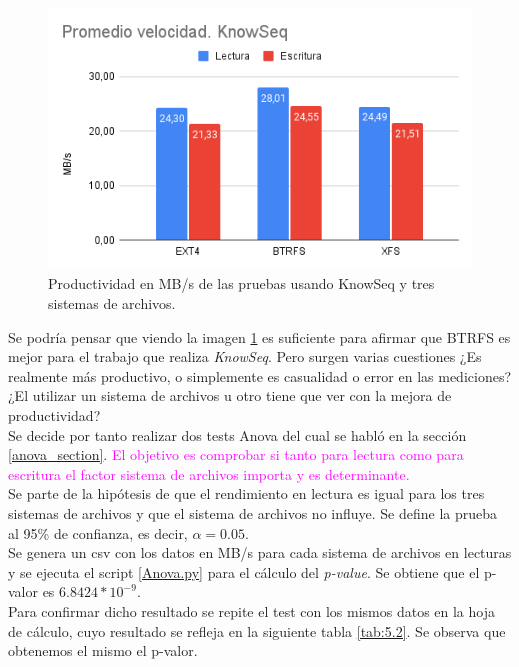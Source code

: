 \begin{figure}[H] 
    \centering
    \includegraphics[scale=0.6]{doc/assets/images/Capitulo4/Knowseq/promknow.png}
    \caption{Productividad en MB/s de las pruebas usando KnowSeq y tres sistemas de archivos.}
    \label{aa}
\end{figure}

Se podría pensar que viendo la imagen \ref{aa} es suficiente para afirmar que BTRFS es mejor para el trabajo que realiza \textit{KnowSeq}. Pero surgen varias cuestiones ¿Es realmente más productivo, o simplemente es casualidad o error en las mediciones?  ¿El utilizar un sistema de archivos u otro tiene que ver con la mejora de productividad?\\

Se decide por tanto realizar dos tests Anova del cual se habló en la sección \ref{anova_section}. %
\textcolor{magenta}{ El objetivo es comprobar si tanto para lectura como para escritura el factor sistema de archivos importa y es determinante.}\\

 Se parte de la hipótesis de que el rendimiento en lectura es igual para los tres sistemas de archivos y que el sistema de archivos no influye. Se define la prueba al 95\% de confianza, es decir, $\alpha = 0.05$.\\

 Se genera un csv con los datos en MB/s para cada sistema de archivos en lecturas y se ejecuta el script \ref{Anova.py} para el cálculo del \textit{p-value}. Se obtiene que el p-valor es $6.8424*10^{-9}$.\\

Para confirmar dicho resultado se repite el test con los mismos datos en la hoja de cálculo, cuyo resultado se refleja en la siguiente tabla \ref{tab:5.2}. Se observa que obtenemos el mismo el p-valor. 

